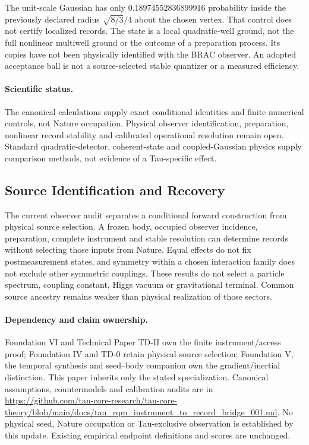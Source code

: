 \documentclass[11pt]{article}
\begin{document}
The unit-scale Gaussian has only $0.18974552836899916$ probability inside
the previously declared radius $\sqrt{8/3}/4$ about the chosen vertex.
That control does not certify localized records. The state is a local
quadratic-well ground, not the full nonlinear multiwell ground or the
outcome of a preparation process. Its copies have not been physically
identified with the BRAC observer. An adopted acceptance ball is not a
source-selected stable quantizer or a measured efficiency.

\paragraph{Scientific status.}
The canonical calculations supply exact conditional identities and finite
numerical controls, not Nature occupation. Physical observer identification,
preparation, nonlinear record stability and calibrated operational resolution
remain open. Standard quadratic-detector, coherent-state and coupled-Gaussian
physics supply comparison methods, not evidence of a Tau-specific effect.

\subsection{Source Identification and Recovery}
The current observer audit separates a conditional forward construction from physical source selection. A frozen body, occupied observer incidence, preparation, complete instrument and stable resolution can determine records without selecting those inputs from Nature. Equal effects do not fix postmeasurement states, and symmetry within a chosen interaction family does not exclude other symmetric couplings. These results do not select a particle spectrum, coupling constant, Higgs vacuum or gravitational terminal. Common source ancestry remains weaker than physical realization of those sectors.

\paragraph{Dependency and claim ownership.}
Foundation VI and Technical Paper TD-II own the finite instrument/access proof; Foundation IV and TD-0 retain physical source selection; Foundation V, the temporal synthesis and seed--body companion own the gradient/inertial distinction. This paper inherits only the stated specialization. Canonical assumptions, countermodels and calibration audits are in \url{https://github.com/tau-core-research/tau-core-theory/blob/main/docs/tau_rqm_instrument_to_record_bridge_001.md}. No physical seed, Nature occupation or Tau-exclusive observation is established by this update. Existing empirical endpoint definitions and scores are unchanged.
\end{document}
